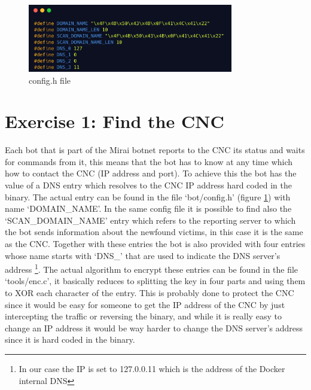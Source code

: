 \begin{figure}
    \centering
    \includegraphics[width=0.8\textwidth]{resources/images/config.png}
    \caption{config.h file}
    \label{fig:config_h}
\end{figure}
\section{Exercise 1: Find the CNC}
Each bot that is part of the Mirai botnet reports to the CNC its status and waits for commands from it, this means that the bot has to know at any time which how to contact the CNC (IP address and port). To achieve this the bot has the value of a DNS entry which resolves to the CNC IP address hard coded in the binary. The actual entry can be found in the file `bot/config.h' (figure \ref{fig:config_h}) with name `DOMAIN\_NAME'. In the same config file it is possible to find also the `SCAN\_DOMAIN\_NAME' entry which refers to the reporting server to which the bot sends information about the newfound victims, in this case it is the same as the CNC. Together with these entries the bot is also provided with four entries whose name starts with `DNS\_' that are used to indicate the DNS server's address \footnote{In our case the IP is set to 127.0.0.11 which is the address of the Docker internal DNS}. The actual algorithm to encrypt these entries can be found in the file `tools/enc.c', it basically reduces to splitting the key in four parts and using them to XOR each character of the entry. This is probably done to protect the CNC since it would be easy for someone to get the IP address of the CNC by just intercepting the traffic or reversing the binary, and while it is really easy to change an IP address it would be way harder to change the DNS server's address since it is hard coded in the binary.

